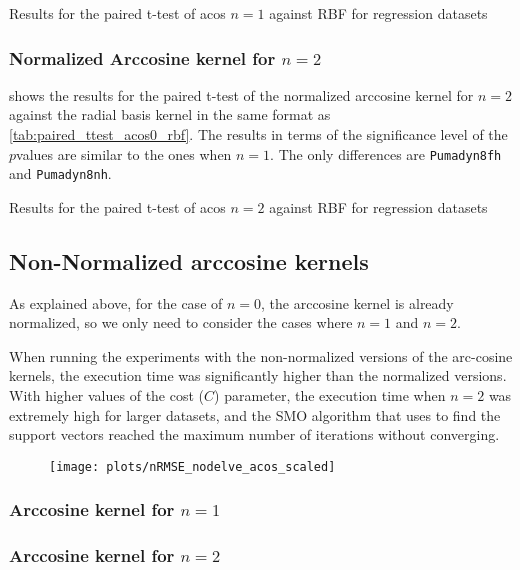 \begin{table}[H]
    \caption{Results for the paired t-test of acos $n=1$ against RBF for regression datasets}
    \label{tab:paired_ttest_acos1_rbf}
    
\end{table}

\subsubsection{Normalized Arccosine kernel for $n=2$}

 shows the results for the paired t-test of
the normalized arccosine kernel for $n=2$ against the radial basis kernel in the
same format as \cref{tab:paired_ttest_acos0_rbf}. The results in terms of
the significance level of the $p$\textendash{}values are similar to the ones
when $n=1$. The only differences are \texttt{Pumadyn8fh} and \texttt{Pumadyn8nh}.

\begin{table}[H]
    \caption{Results for the paired t-test of acos $n=2$ against RBF for regression datasets}
    \label{tab:paired_ttest_acos2_rbf}
    
\end{table}

\subsection{Non-Normalized arccosine kernels}

As explained above, for the case of $n=0$, the arccosine kernel is already
normalized, so we only need to consider the cases where $n=1$ and $n=2$.

When running the experiments with the non-normalized versions of the arc-cosine
kernels, the execution time was significantly higher than the normalized versions.
With higher values of the cost ($C$) parameter, the execution time when $n=2$ was
extremely high for larger datasets, and the SMO algorithm that \libsvm uses to find
the support vectors reached the maximum number of iterations without converging.


\begin{figure}[H]
    \texttt{[image: plots/nRMSE\_nodelve\_acos\_scaled]}
\end{figure}

\subsubsection{Arccosine kernel for $n=1$}

\subsubsection{Arccosine kernel for $n=2$}
